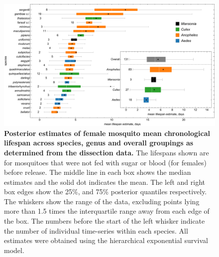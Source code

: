 \documentclass[12pt]{article}
\begin{document}
{\begin{figure}[h]
	\centerline{\includegraphics[width=1\textwidth]{./Figure_files/dissection_lifetimes_exponential_chron.pdf}}
	\caption{\textbf{Posterior estimates of female mosquito mean chronological lifespan across species, genus and overall groupings as determined from the dissection data.} The lifespans shown are for mosquitoes that were not fed with sugar or blood (for females) before release. The middle line in each box shows the median estimates and the solid dot indicates the mean. The left and right box edges show the 25\%, and 75\% posterior quantiles respectively. The whiskers show the range of the data, excluding points lying more than 1.5 times the interquartile range away from each edge of the box. The numbers before the start of the left whisker indicate the number of individual time-series within each species. All estimates were obtained using the hierarchical exponential survival model.}
	\label{fig:dissection_lifetimes_exponential_chron}
\end{figure}

}
\end{document}
